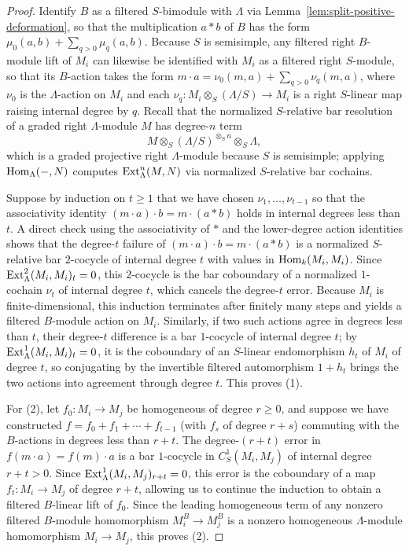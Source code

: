 \begin{proof}
Identify $B$ as a filtered $S$-bimodule with $\Lambda$ via
Lemma~\ref{lem:split-positive-deformation}, so that the multiplication $a*b$
of $B$ has the form $\mu_0(a,b)+\sum_{q>0}\mu_q(a,b)$. Because $S$ is
semisimple, any filtered right $B$-module lift of $M_i$ can likewise be
identified with $M_i$ as a filtered right $S$-module, so that its $B$-action
takes the form $m\cdot a=\nu_0(m,a)+\sum_{q>0}\nu_q(m,a)$, where $\nu_0$ is
the $\Lambda$-action on $M_i$ and each $\nu_q:M_i\otimes_S(\Lambda/S)\to M_i$
is a right $S$-linear map raising internal degree by $q$. Recall that the
normalized $S$-relative bar resolution of a graded right $\Lambda$-module $M$
has degree-$n$ term
\[
           M\otimes_S(\Lambda/S)^{\otimes_S n}\otimes_S \Lambda,
\]
which is a graded projective right $\Lambda$-module because $S$ is
semisimple; applying $\operatorname{Hom}_\Lambda(-,N)$ computes $\operatorname{Ext}^n_\Lambda(M,N)$ via
normalized $S$-relative bar cochains.

Suppose by induction on $t\geq1$ that we have chosen $\nu_1,\ldots,\nu_{t-1}$
so that the associativity identity $(m\cdot a)\cdot b=m\cdot(a*b)$ holds in
internal degrees less than $t$. A direct check using the associativity of
$*$ and the lower-degree action identities shows that the degree-$t$ failure
of $(m\cdot a)\cdot b=m\cdot(a*b)$ is a normalized $S$-relative bar
$2$-cocycle of internal degree $t$ with values in $\operatorname{Hom}_k(M_i,M_i)$. Since
$\operatorname{Ext}^2_\Lambda(M_i,M_i)_t=0$, this $2$-cocycle is the bar coboundary of a
normalized $1$-cochain $\nu_t$ of internal degree $t$, which cancels the
degree-$t$ error. Because $M_i$ is finite-dimensional, this induction
terminates after finitely many steps and yields a filtered $B$-module action
on $M_i$. Similarly, if two such actions agree in degrees less than $t$,
their degree-$t$ difference is a bar $1$-cocycle of internal degree $t$; by
$\operatorname{Ext}^1_\Lambda(M_i,M_i)_t=0$, it is the coboundary of an $S$-linear
endomorphism $h_t$ of $M_i$ of degree $t$, so conjugating by the invertible
filtered automorphism $1+h_t$ brings the two actions into agreement through
degree $t$. This proves (1).

For (2), let $f_0:M_i\to M_j$ be homogeneous of degree $r\geq0$, and suppose
we have constructed $f=f_0+f_1+\cdots+f_{t-1}$ (with $f_s$ of degree $r+s$)
commuting with the $B$-actions in degrees less than $r+t$. The degree-$(r+t)$
error in $f(m\cdot a)=f(m)\cdot a$ is a bar $1$-cocycle in
$C^1_S(M_i,M_j)$ of internal degree $r+t>0$. Since
$\operatorname{Ext}^1_\Lambda(M_i,M_j)_{r+t}=0$, this error is the coboundary of a map
$f_t:M_i\to M_j$ of degree $r+t$, allowing us to continue the induction to
obtain a filtered $B$-linear lift of $f_0$. Since the leading homogeneous
term of any nonzero filtered $B$-module homomorphism $M_i^B\to M_j^B$ is a
nonzero homogeneous $\Lambda$-module homomorphism $M_i\to M_j$, this proves
(2).


\end{proof}
